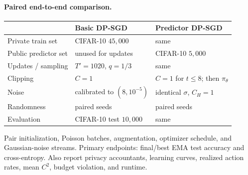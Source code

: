 \documentclass[10pt]{article}
\newcommand{\1}{\mathbf{1}}
\begin{document}
\paragraph{Paired end-to-end comparison.}
\begin{center}
\begin{tabular}{lll}
\toprule
 & Basic DP-SGD & Predictor DP-SGD \\
\midrule
Private train set & CIFAR-10 $45{,}000$ & same \\
Public predictor set & unused for updates & CIFAR-10 $5{,}000$ \\
Updates / sampling & $T'=1020$, $q=1/3$ & same \\
Clipping & $C=1$ & $C=1$ for $t\le8$; then $\pi_\theta$ \\
Noise & calibrated to $(8,10^{-5})$ & identical $\sigma$, $C_H=1$ \\
Randomness & paired seeds & paired seeds \\
Evaluation & CIFAR-10 test $10{,}000$ & same \\
\bottomrule
\end{tabular}
\end{center}
Pair initialization, Poisson batches, augmentation, optimizer schedule, and
Gaussian-noise streams. Primary endpoints: final/best EMA test accuracy and
cross-entropy. Also report privacy accountants, learning curves, realized
action rates, mean $C^2$, budget violation, and runtime.
\end{document}
